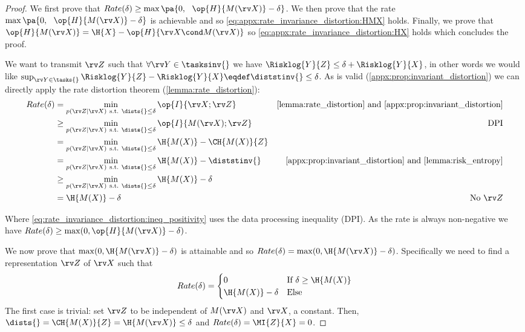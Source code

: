 \documentclass[final]{article}
\begin{document}
\begin{proof}
We first prove that $Rate(\delta) \geq \max \pa{0, \ \ \op{H}{M(\rv X)} - \delta}$.
We then prove that the rate $\max \pa{0, \ \ \op{H}{M(\rv X)} - \delta}$ is achievable and so \cref{eq:appx:rate_invariance_distortion:HMX} holds.
Finally, we prove that $\op{H}{M(\rv X)} = \H{X} - \op{H}{\rv X \cond M(\rv X)}$ so \cref{eq:appx:rate_invariance_distortion:HX} holds which concludes the proof.

We want to transmit $\rv Z$ such that $\forall \rv Y \in \tasksinv{}$ we have $\Risklog{Y}{Z} \leq \delta + \Risklog{Y}{X}$, in other words we would like $\sup_{ \rv Y \in \tasks{}} \Risklog{Y}{Z} - \Risklog{Y}{X} \eqdef \diststinv{} \leq \delta $.
As \disttextinv{} is valid (\cref{appx:prop:invariant_distortion}) we can directly apply the rate distortion theorem (\cref{lemma:rate_distortion}):
\begin{align}
Rate(\delta) &= \min_{p(\rv Z| \rv X) \ \text{s.t.} \ \dists{} \leq \delta}   \op{I}{\rv X; \rv Z}     & \text{\cref{lemma:rate_distortion} and \cref{appx:prop:invariant_distortion}} \label{eq:rate_invariance_constrained}\\
&\geq \min_{p(\rv Z| \rv X) \ \text{s.t.} \ \dists{} \leq \delta} \op{I}{M(\rv X); \rv Z}  & \text{DPI} \label{eq:rate_invariance_distortion:ineq_positivity} \\
&= \min_{p(\rv Z| \rv X) \ \text{s.t.} \ \dists{} \leq \delta} \H{M(X)} - \CH{M(X)}{Z}  \\
&= \min_{p(\rv Z| \rv X) \ \text{s.t.} \ \dists{} \leq \delta} \H{M(X)} - \diststinv{}  & \text{\cref{appx:prop:invariant_distortion} and \cref{lemma:risk_entropy}} \\
&\geq \min_{p(\rv Z| \rv X) \ \text{s.t.} \ \dists{} \leq \delta} \H{M(X)} - \delta \label{eq:rate_invariance_distortion:ineq_delta}\\
&=  \H{M(X)} - \delta & \text{No } \rv Z 
\end{align}

Where \cref{eq:rate_invariance_distortion:ineq_positivity} uses the data processing inequality (DPI). 
As the rate is always non-negative we have  $Rate(\delta) \geq \max(0, \op{H}{M(\rv X)} - \delta)$.

We now prove that $\max(0,\H{M(\rv X)} - \delta)$ is attainable and so $Rate(\delta) = \max(0, \H{M(\rv X)} - \delta)$.
Specifically we need to find a representation $\rv Z$ of $\rv X$ such that 
\begin{equation}\label{eq:two_cases_theorem}
Rate(\delta) = 
\begin{cases}
0 & \text{If } \delta \geq \H{M(X)} \\
\H{M(X)} - \delta & \text{Else}  \\
\end{cases}
\end{equation}
The first case is trivial: set $\rv Z$ to be independent of $M(\rv X)$ and $\rv X$, \eg a constant.
Then, $\dists{}=\CH{M(X)}{Z}=\H{M(\rv X)}\leq \delta $ and $Rate(\delta) =\MI{Z}{X}=0$.


\end{proof}
\end{document}
